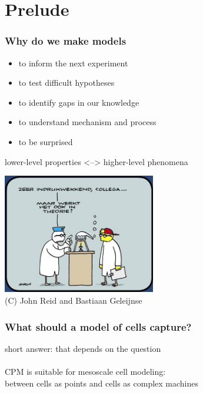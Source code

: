 \documentclass[compress]{beamer}
\begin{document}
\section{Prelude}
\begin{frame}
  \frametitle{Why do we make models}
  \begin{itemize}
   \item to inform the next experiment
   \item to test difficult hypotheses
   \item to identify gaps in our knowledge %
   \item to understand mechanism and process %
   \item to be surprised
  \end{itemize}
 lower-level properties <--> higher-level phenomena\\
 
 \begin{center}
     \includegraphics[width=0.5\textwidth]{figures/fokke_sukke.JPG}\\
     \tiny (C) John Reid and Bastiaan Geleijnse
     \end{center}
 
\end{frame}

\begin{frame}
\frametitle{What should a model of cells capture?} 
 
 short answer: that depends on the question %
 \\~\\
 CPM is suitable for mesoscale cell modeling:\\
 between cells as points and cells as complex machines\\
 
\end{frame}
\end{document}
